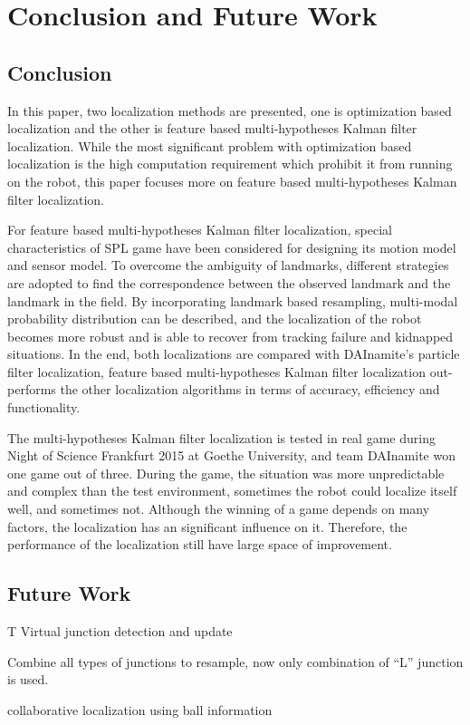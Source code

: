 \chapter{Conclusion and Future Work\label{cha:chapter7}}

\section{Conclusion\label{sec:conclusion}}
In this paper, two localization methods are presented, one is optimization based localization and the other is feature based multi-hypotheses Kalman filter localization. While the most significant problem with optimization based localization is the high computation requirement which prohibit it from running on the robot, this paper focuses more on feature based multi-hypotheses Kalman filter localization. 

For feature based multi-hypotheses Kalman filter localization, special characteristics of \gls{SPL} game have been considered for designing its motion model and sensor model. To overcome the ambiguity of landmarks, different strategies are adopted to find the correspondence between the observed landmark and the landmark in the field. By incorporating landmark based resampling, multi-modal probability distribution can be described, and the localization of the robot becomes more robust and is able to recover from tracking failure and kidnapped situations. In the end, both localizations are compared with DAInamite's particle filter localization, feature based  multi-hypotheses Kalman filter localization out-performs the other localization algorithms in terms of accuracy, efficiency and functionality. 

The multi-hypotheses Kalman filter localization is tested in real game during Night of Science Frankfurt 2015 at Goethe University, and team DAInamite won one game out of three. During the game, the situation was more unpredictable and complex than the test environment, sometimes the robot could localize itself well, and sometimes not. Although the winning of a game depends on many factors, the localization has an significant influence on it. Therefore, the performance of the localization still have large space of improvement.  

\section{Future Work\label{sec:future}}
T
Virtual junction detection and update

Combine all types of junctions to resample, now only combination of ``L'' junction is used.

collaborative localization using ball information
